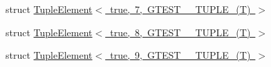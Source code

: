 \begin{DoxyCompactItemize}
\item 
struct \mbox{\hyperlink{structstd_1_1tr1_1_1gtest__internal_1_1TupleElement_3_01true_00_017_00_01GTEST__10__TUPLE___07T_08_01_4}{Tuple\+Element$<$ true, 7, G\+T\+E\+S\+T\+\_\+\_\+\+T\+U\+P\+L\+E\+\_\+(\+T) $>$}}
\item 
struct \mbox{\hyperlink{structstd_1_1tr1_1_1gtest__internal_1_1TupleElement_3_01true_00_018_00_01GTEST__10__TUPLE___07T_08_01_4}{Tuple\+Element$<$ true, 8, G\+T\+E\+S\+T\+\_\+\_\+\+T\+U\+P\+L\+E\+\_\+(\+T) $>$}}
\item 
struct \mbox{\hyperlink{structstd_1_1tr1_1_1gtest__internal_1_1TupleElement_3_01true_00_019_00_01GTEST__10__TUPLE___07T_08_01_4}{Tuple\+Element$<$ true, 9, G\+T\+E\+S\+T\+\_\+\_\+\+T\+U\+P\+L\+E\+\_\+(\+T) $>$}}
\end{DoxyCompactItemize}
